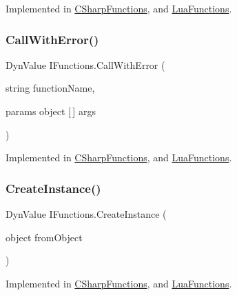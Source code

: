 Implemented in \hyperlink{class_c_sharp_functions_aaa94615d2df3daab6e2d22a4b257d2e0}{C\+Sharp\+Functions}, and \hyperlink{class_lua_functions_ac1bbf0ec272f91f4322e89796deadf52}{Lua\+Functions}.

\mbox{\label{interface_i_functions_a6914f7ab45913120802554ac2ef28dba}} 
\subsubsection{\texorpdfstring{Call\+With\+Error()}{CallWithError()}}
{\footnotesize\ttfamily Dyn\+Value I\+Functions.\+Call\+With\+Error (\begin{DoxyParamCaption}\item[{string}]{function\+Name,  }\item[{params object \mbox{[}$\,$\mbox{]}}]{args }\end{DoxyParamCaption})}



Implemented in \hyperlink{class_c_sharp_functions_a734f7a4d7c779388343d55e42de203c2}{C\+Sharp\+Functions}, and \hyperlink{class_lua_functions_a8fcb93802ded2a89af4ce20efef82a70}{Lua\+Functions}.

\mbox{\label{interface_i_functions_a7578bf930745a057a9e24f6048858fe2}} 
\subsubsection{\texorpdfstring{Create\+Instance()}{CreateInstance()}}
{\footnotesize\ttfamily Dyn\+Value I\+Functions.\+Create\+Instance (\begin{DoxyParamCaption}\item[{object}]{from\+Object }\end{DoxyParamCaption})}



Implemented in \hyperlink{class_c_sharp_functions_ae2a8accaa0f465b627997d145452ec19}{C\+Sharp\+Functions}, and \hyperlink{class_lua_functions_a48e53ec3f02676d03050066fd3555d12}{Lua\+Functions}.

\mbox{\label{interface_i_functions_a5acd536d97990a6d5d575dce8bfff5f1}} 
